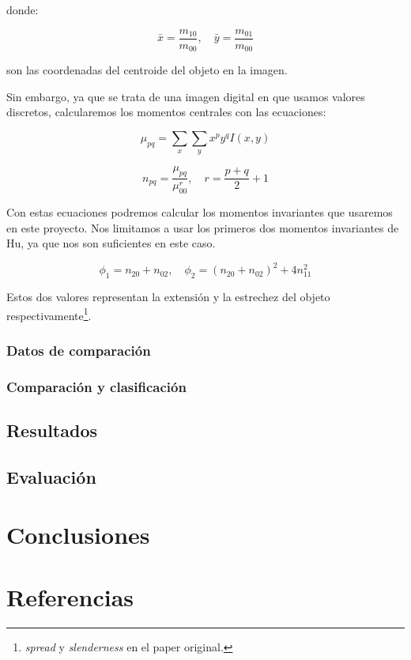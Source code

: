 \documentclass[letter]{article}
\begin{document}
donde:

$$ \bar x = \frac{m_{10}}{m_{00}}, \quad \bar y = \frac{m_{01}}{m_{00}} $$

son las coordenadas del centroide del objeto en la imagen.

Sin embargo, ya que se trata de una imagen digital en que usamos valores
discretos, calcularemos los momentos centrales con las ecuaciones:

$$
\mu_{pq} = \sum_x \sum_y x^p y^q I(x, y)
$$

$$ n_{pq} = \frac{\mu_{pq}}{\mu_{00}^r}, \quad r=\frac{p+q}{2}+1 $$

Con estas ecuaciones podremos calcular los momentos invariantes que usaremos en
este proyecto. Nos limitamos a usar los primeros dos momentos invariantes de Hu,
ya que nos son suficientes en este caso.

$$ \phi_1 = n_{20} + n_{02}, \quad \phi_2 = (n_{20} + n_{02})^2 + 4n_{11}^2 $$

Estos dos valores representan la extensión y la estrechez del objeto
respectivamente\footnote{\emph{spread} y \emph{slenderness} en el paper original.}.

\subsubsection{Datos de comparación}
\label{sec:org158520d}

\subsubsection{Comparación y clasificación}
\label{sec:org216510e}

\subsection{Resultados}
\label{sec:org5d5ed8a}
\subsection{Evaluación}
\label{sec:org2f084ea}
\section{Conclusiones}
\label{sec:org991eb14}

\section{Referencias}
\label{sec:orgae7fb6c}
\end{document}
